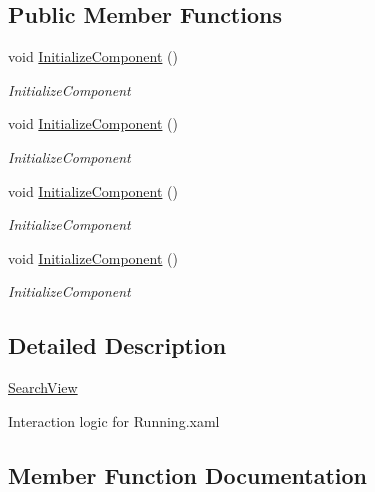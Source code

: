 \subsection*{Public Member Functions}
\begin{DoxyCompactItemize}
\item 
void \hyperlink{class_presentation_1_1_view_1_1_search_view_ac553fc7552d2de3e43a6b574d7176220}{Initialize\+Component} ()
\begin{DoxyCompactList}\small\item\em Initialize\+Component \end{DoxyCompactList}\item 
void \hyperlink{class_presentation_1_1_view_1_1_search_view_ac553fc7552d2de3e43a6b574d7176220}{Initialize\+Component} ()
\begin{DoxyCompactList}\small\item\em Initialize\+Component \end{DoxyCompactList}\item 
void \hyperlink{class_presentation_1_1_view_1_1_search_view_ac553fc7552d2de3e43a6b574d7176220}{Initialize\+Component} ()
\begin{DoxyCompactList}\small\item\em Initialize\+Component \end{DoxyCompactList}\item 
void \hyperlink{class_presentation_1_1_view_1_1_search_view_ac553fc7552d2de3e43a6b574d7176220}{Initialize\+Component} ()
\begin{DoxyCompactList}\small\item\em Initialize\+Component \end{DoxyCompactList}\end{DoxyCompactItemize}


\subsection{Detailed Description}
\hyperlink{class_presentation_1_1_view_1_1_search_view}{Search\+View} 

Interaction logic for Running.\+xaml 

\subsection{Member Function Documentation}
\mbox{\label{class_presentation_1_1_view_1_1_search_view_ac553fc7552d2de3e43a6b574d7176220}} 
